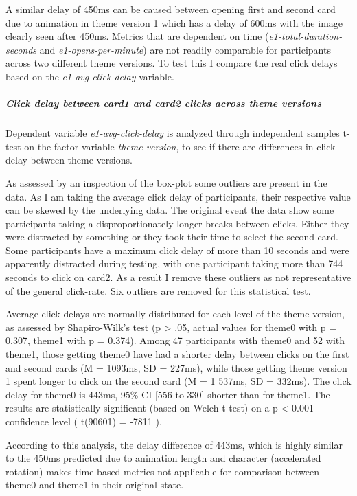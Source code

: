 	A similar delay of 450ms can be caused between opening first and second card due to animation in theme version 1 which has a delay of 600ms with the image clearly seen after 450ms. Metrics that are dependent on time (\textit{e1-total-duration-seconds} and \textit{e1-opens-per-minute}) are not readily comparable for participants across two different theme versions. To test this I compare the real click delays based on the \textit{e1-avg-click-delay} variable.

	\subparagraph{Click delay between card1 and card2 clicks across theme versions} Dependent variable \textit{e1-avg-click-delay} is analyzed through independent samples t-test on the factor variable \textit{theme-version}, to see if there are differences in click delay between theme versions.
	
	As assessed by an inspection of the box-plot some outliers are present in the data. As I am taking the average click delay of participants, their respective value can be skewed by the underlying data. The original event the data show some participants taking a disproportionately longer breaks between clicks. Either they were distracted by something or they took their time to select the second card. 
	Some participants have a maximum click delay of more than 10 seconds and were apparently distracted during testing, with one participant taking more than 744 seconds to click on card2. As a result I remove these outliers as not representative of the general click-rate. Six outliers are removed for this statistical test.
	
	Average click delays are normally distributed for each level of the theme version, as assessed by Shapiro-Wilk's test (p > .05, actual values for theme0 with p = 0.307, theme1 with p = 0.374). Among 47 participants with theme0 and 52 with theme1, those getting theme0 have had a shorter delay between clicks on the first and second cards (M = 1093ms, SD = 227ms), while those getting theme version 1 spent longer to click on the second card (M = 1 537ms, SD = 332ms). The click delay for theme0 is 443ms, 95\% CI [556 to 330] shorter than for theme1. The results are statistically significant (based on Welch t-test) on a p < 0.001 confidence level ( t(90601) = -7811 ).
	
	According to this analysis, the delay difference of 443ms, which is highly similar to the 450ms predicted due to animation length and character (accelerated rotation) makes time based metrics not applicable for comparison between theme0 and theme1 in their original state.
	
